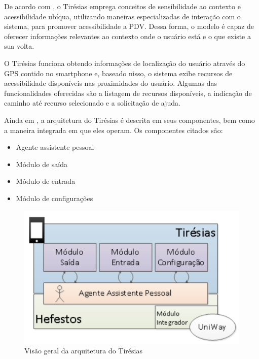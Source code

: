 \documentclass[english,brazilian]{UNISINOSmonografia}
\begin{document}
De acordo com , o Tirésias emprega conceitos de sensibilidade ao contexto e acessibilidade ubíqua, utilizando maneiras especializadas de interação com o sistema, para promover acessibilidade a PDV. Dessa forma, o modelo é capaz de oferecer informações relevantes ao contexto onde o usuário está e o que existe a sua volta.

O Tirésias funciona obtendo informações de localização do usuário através do GPS contido no smartphone e, baseado nisso, o sistema exibe recursos de acessibilidade disponíveis nas proximidades do usuário. Algumas das funcionalidades oferecidas são a listagem de recursos disponíveis, a indicação de caminho até recurso selecionado e a solicitação de ajuda.

Ainda em , a arquitetura do Tirésias é descrita em seus componentes, bem como a maneira integrada em que eles operam. Os componentes citados são:

\begin{itemize} 
	\item Agente assistente pessoal
	\item Módulo de saída
	\item Módulo de entrada
	\item Módulo de configurações
\end{itemize}

\begin{figure}
	\caption{Visão geral da arquitetura do Tirésias}
	\label{fig:visaoGeralTiresias}
	\centering%
	\begin{minipage}{.6\textwidth}
		\includegraphics[width=\textwidth]{imgs/tiresiasArquitetura}
		\end{minipage}
\end{figure}
\end{document}
